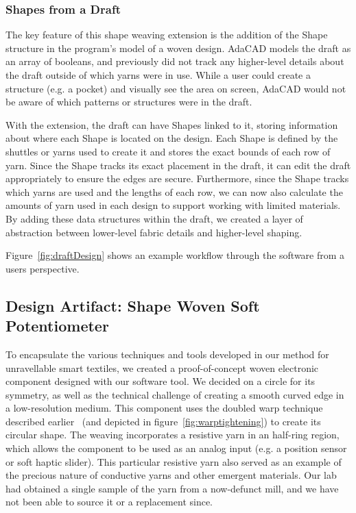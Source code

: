 \subsubsection{Shapes from a Draft}

The key feature of this shape weaving extension is the addition of the Shape structure in the program's model of a woven design. AdaCAD models the draft as an array of booleans, and previously did not track any higher-level details about the draft outside of which yarns were in use. While a user could create a structure (e.g. a pocket) and visually see the area on screen, AdaCAD would not be aware of which patterns or structures were in the draft.

With the extension, the draft can have Shapes linked to it, storing information about where each Shape is located on the design. Each Shape is defined by the shuttles or yarns used to create it and stores the exact bounds of each row of yarn. Since the Shape tracks its exact placement in the draft, it can edit the draft appropriately to ensure the edges are secure. Furthermore, since the Shape tracks which yarns are used and the lengths of each row, we can now also calculate the amounts of yarn used in each design to support working with limited materials. By adding these data structures within the draft, we created a layer of abstraction between lower-level fabric details and higher-level shaping.

Figure~\ref{fig:draftDesign} shows an example workflow through the software from a users perspective.

\subsection{Design Artifact: Shape Woven Soft Potentiometer}

To encapsulate the various techniques and tools developed in our method for unravellable smart textiles, we created a proof-of-concept woven electronic component designed with our software tool. We decided on a circle for its symmetry, as well as the technical challenge of creating a smooth curved edge in a low-resolution medium. This component uses the doubled warp technique described earlier ~{(and depicted in figure~\ref{fig:warptightening})} to create its circular shape. The weaving incorporates a resistive yarn in an half-ring region, which allows the component to be used as an analog input (e.g. a position sensor or soft haptic slider). This particular resistive yarn also served as an example of the precious nature of conductive yarns and other emergent materials. Our lab had obtained a single sample of the yarn from a now-defunct mill, and we have not been able to source it or a replacement since.

